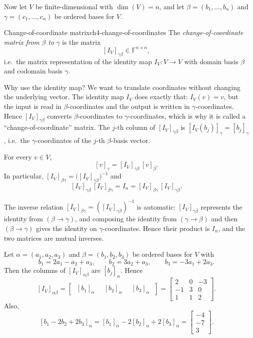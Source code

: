 Now let $V$ be finite-dimensional with $\dim(V)=n$, and let $\beta=(b_1,\dots,b_n)$ and $\gamma=(c_1,\dots,c_n)$ be ordered bases for $V$.

\begin{definition}{Change-of-coordinate matrix}{ch4-change-of-coordinates}
The \emph{change-of-coordinate matrix from $\beta$ to $\gamma$} is the matrix
\[
[I_V]_{\gamma\beta}\in\mathbb{F}^{n\times n},
\]
i.e.\ the matrix representation of the identity map $I_V:V\to V$ with domain basis $\beta$ and codomain basis $\gamma$.
\end{definition}

Why use the identity map?  We want to translate coordinates without changing the underlying vector.
The identity map $I_V$ does exactly that: $I_V(v)=v$, but the input is read in $\beta$-coordinates and the output is written in $\gamma$-coordinates.
Hence $[I_V]_{\gamma\beta}$ converts $\beta$-coordinates to $\gamma$-coordinates, which is why it is called a ``change-of-coordinate'' matrix.
The $j$-th column of $[I_V]_{\gamma\beta}$ is $[I_V(b_j)]_\gamma = [b_j]_\gamma$, i.e.\ the $\gamma$-coordinates of the $j$-th $\beta$-basis vector.

\begin{keyformula}[title={Key Formula: coordinate conversion}]
For every $v\in V$,
\[
[v]_\gamma = [I_V]_{\gamma\beta}\,[v]_\beta.
\]
In particular, $[I_V]_{\beta\gamma}=\bigl([I_V]_{\gamma\beta}\bigr)^{-1}$ and
\[
[I_V]_{\gamma\beta}\,[I_V]_{\beta\gamma}=I_n=[I_V]_{\beta\gamma}\,[I_V]_{\gamma\beta}.
\]
\end{keyformula}

The inverse relation $[I_V]_{\beta\gamma}=([I_V]_{\gamma\beta})^{-1}$ is automatic: $[I_V]_{\gamma\beta}$ represents the identity from $(\beta\to\gamma)$, and composing the identity from $(\gamma\to\beta)$ and then $(\beta\to\gamma)$ gives the identity on $\gamma$-coordinates.
Hence their product is $I_n$, and the two matrices are mutual inverses.

\begin{examplebox}[title={Worked Example (Lecture Week 7): computing $[I_V]_{\alpha\beta}$ from basis relations}]
Let $\alpha=(a_1,a_2,a_3)$ and $\beta=(b_1,b_2,b_3)$ be ordered bases for $V$ with
\[
b_1=2a_1-a_2+a_3,\qquad
b_2=3a_2+a_3,\qquad
b_3=-3a_1+2a_3.
\]
Then the columns of $[I_V]_{\alpha\beta}$ are $[b_j]_\alpha$. Hence
\[
[I_V]_{\alpha\beta}
=
\begin{bmatrix}
\;[b_1]_\alpha\;&\;[b_2]_\alpha\;&\;[b_3]_\alpha\;
\end{bmatrix}
=
\begin{bmatrix}
2 & 0 & -3\\
-1 & 3 & 0\\
1 & 1 & 2
\end{bmatrix}.
\]
Also,
\[
[b_1-2b_2+2b_3]_\alpha=[b_1]_\alpha-2[b_2]_\alpha+2[b_3]_\alpha
=
\begin{bmatrix}-4\\-7\\3\end{bmatrix}.
\]
\end{examplebox}

